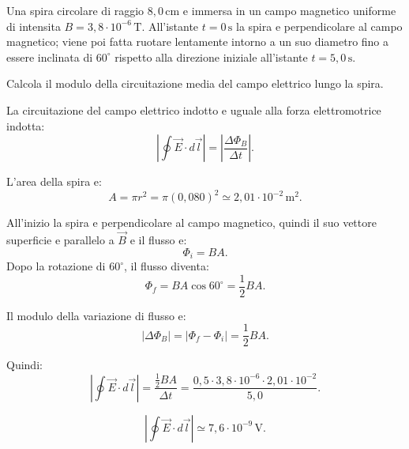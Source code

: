 
\begin{esercizio}
Una spira circolare di raggio \(8{,}0\,\mathrm{cm}\) e immersa in un campo
magnetico uniforme di intensita \(B = 3{,}8 \cdot 10^{-6}\,\mathrm{T}\).
All'istante \(t=0\,\mathrm{s}\) la spira e perpendicolare al campo magnetico;
viene poi fatta ruotare lentamente intorno a un suo diametro fino a essere
inclinata di \(60^\circ\) rispetto alla direzione iniziale all'istante
\(t=5{,}0\,\mathrm{s}\).

Calcola il modulo della circuitazione media del campo elettrico lungo la spira.
\end{esercizio}

\begin{soluzione}
La circuitazione del campo elettrico indotto e uguale alla forza elettromotrice
indotta:
\[
\left|\oint \vec E\cdot d\vec l\right|
=\left|\frac{\Delta\Phi_B}{\Delta t}\right|.
\]

L'area della spira e:
\[
A=\pi r^2=\pi(0{,}080)^2
\simeq 2{,}01\cdot 10^{-2}\,\mathrm{m^2}.
\]

All'inizio la spira e perpendicolare al campo magnetico, quindi il suo vettore
superficie e parallelo a \(\vec B\) e il flusso e:
\[
\Phi_i=BA.
\]
Dopo la rotazione di \(60^\circ\), il flusso diventa:
\[
\Phi_f=BA\cos 60^\circ=\frac{1}{2}BA.
\]

Il modulo della variazione di flusso e:
\[
|\Delta\Phi_B|=\left|\Phi_f-\Phi_i\right|
=\frac{1}{2}BA.
\]

Quindi:
\[
\left|\oint \vec E\cdot d\vec l\right|
=\frac{\frac{1}{2}BA}{\Delta t}
=\frac{0{,}5\cdot 3{,}8\cdot 10^{-6}\cdot
2{,}01\cdot 10^{-2}}{5{,}0}.
\]

\[
\left|\oint \vec E\cdot d\vec l\right|
\simeq 7{,}6\cdot 10^{-9}\,\mathrm{V}.
\]
\end{soluzione}
